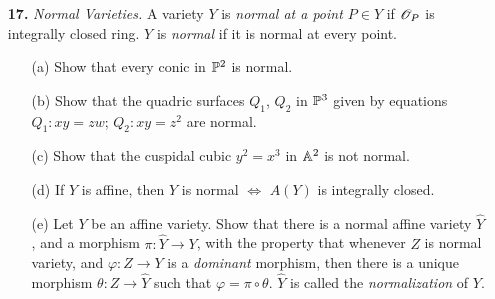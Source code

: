 \documentclass{article}
\begin{document}
\begin{enumerate} [label=\textbf{\arabic*.}, leftmargin=-0.05em]
\begin{proof}
\begin{itemize} [leftmargin=0cm]
        \item[(c)] Suppose we have morphisms $Z \to X$ and $Z \to Y$. This induces $k$-algebra homomorphisms $A(X) \to \fO(Z)$ and $A(Y) \to \fO(Z)$, which defines a $k$-bilinear map $A(X) \times A(Y) \to \fO(Z)$. By the universal property of tensor products, we have a unique $k$-algebra homomorphism $A(X) \otimes_k A(Y) \to \fO(W)$, hence we have a unique morphism $W \to X \times Y$.
        \[ \begin{tikzcd}
            \fO(Z) &                                        &                                        \\
                   & A(X) \otimes_k A(Y) \arrow[lu, dashed] & A(Y) \arrow[llu, bend right] \arrow[l] \\
                   & A(X) \arrow[luu, bend left] \arrow[u]  &                                       
            \end{tikzcd} \]
        
        \item[(d)] If $t_1, \dots, t_n$ and $u_1, \dots, u_m$ are coordinates for $X$ and $Y$, respectively, then each $t_i$, $u_j$ are algebraically independent in $A(X \times Y)$, that is the quotient field of $A(X \times Y)$ has transcendence degree $n + m$, hence $\dim{X \times Y} = \dim{X} + \dim{Y}$.
    \end{itemize}
\end{proof}

\item[\textbf{17.}] \textit{Normal Varieties.} A variety $Y$ is \textit{normal at a point $P \in Y$} if $\mathscr{O}_P$ is integrally closed ring. $Y$ is \textit{normal} if it is normal at every point. 
\begin{itemize}
    \item[(a)] Show that every conic in $\mathbb{P}^2$ is normal.
    \item[(b)] Show that the quadric surfaces $Q_1$, $Q_2$ in $\mathbb{P}^3$ given by equations $Q_1 : xy = zw$; $Q_2 : xy = z^2$ are normal.
    \item[(c)] Show that the cuspidal cubic $y^2 = x^3$ in $\mathbb{A}^2$ is not normal.
    \item[(d)] If $Y$ is affine, then $Y$ is normal $\iff$ $A(Y)$ is integrally closed.
    \item[(e)] Let $Y$ be an affine variety. Show that there is a normal affine variety $\hat{Y}$, and a morphism $\pi : \hat{Y} \to Y$, with the property that whenever $Z$ is normal variety, and $\varphi :Z \to Y$ is a \textit{dominant} morphism, then there is a unique morphism $\theta : Z \to \hat{Y}$ such that $\varphi = \pi \circ \theta$. $\hat{Y}$ is called the \textit{normalization} of $Y$.
\end{itemize}


\end{enumerate}
\end{document}

